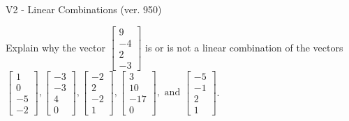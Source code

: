 \begin{exercise}
  \begin{exerciseTitle}V2 - Linear Combinations (ver. 950)\end{exerciseTitle}
  \begin{exerciseStatement}
    Explain why the vector \(\left[\begin{array}{c}
9 \\
-4 \\
2 \\
-3
\end{array}\right]\)  is or is not a linear 
	combination of the vectors \(\left[\begin{array}{c}
1 \\
0 \\
-5 \\
-2
\end{array}\right] , \left[\begin{array}{c}
-3 \\
-3 \\
4 \\
0
\end{array}\right] , \left[\begin{array}{c}
-2 \\
2 \\
-2 \\
1
\end{array}\right] , \left[\begin{array}{c}
3 \\
10 \\
-17 \\
0
\end{array}\right] , \text{ and } \left[\begin{array}{c}
-5 \\
-1 \\
2 \\
1
\end{array}\right]\).
	



\end{exerciseStatement}
\end{exercise}
